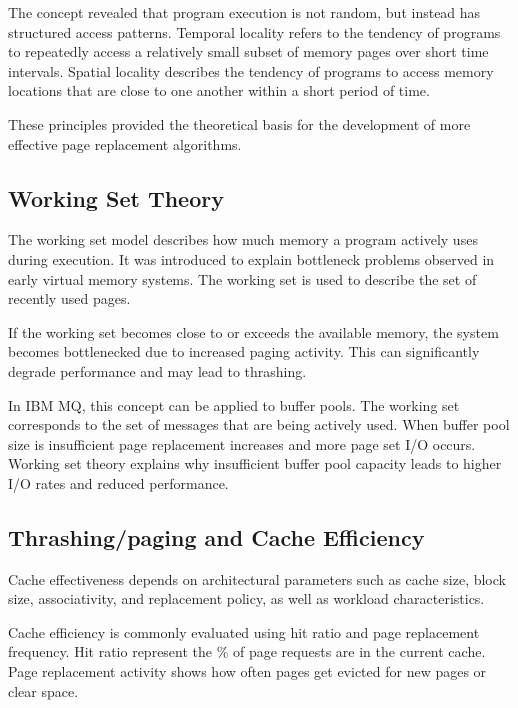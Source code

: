 The concept revealed that program execution is not random, but instead has structured access patterns. Temporal locality refers to the tendency of programs to repeatedly access a relatively small subset of memory pages over short time intervals. Spatial locality describes the tendency of programs to access memory locations that are close to one another within a short period of time. 

These principles provided the theoretical basis for the development of more effective page replacement algorithms. \autocite{denning2005_locality_principle}


\subsection{Working Set Theory}%
\label{subsec:working-set}

The working set model describes how much memory a program actively uses during execution. It was introduced to explain bottleneck problems observed in early virtual memory systems. The working set is used to describe the set of recently used pages.

If the working set becomes close to or exceeds the available memory, the system becomes bottlenecked due to increased paging activity. This can significantly degrade performance and may lead to thrashing. \autocite{denning1968_working_set}

In IBM MQ, this concept can be applied to buffer pools. The working set corresponds to the set of messages that are being actively used. When buffer pool size is insufficient page replacement increases and more page set I/O occurs. Working set theory explains why insufficient buffer pool capacity leads to higher I/O rates and reduced performance.

\subsection{Thrashing/paging and Cache Efficiency}%
\label{subsec:thrashing-cache-efficiency}
    
Cache effectiveness depends on architectural parameters such as cache size, block size, associativity, and replacement policy, as well as workload characteristics. \autocite{smith1982_cache_memories}

Cache efficiency is commonly evaluated using hit ratio and page replacement frequency. Hit ratio represent the \% of page requests are in the current cache. Page replacement activity shows how often pages get evicted for new pages or clear space.

